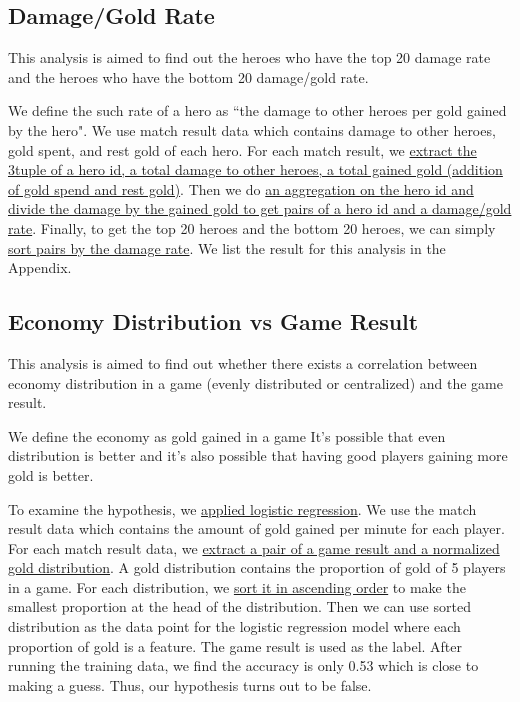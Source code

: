 \documentclass{article}
\begin{document}
\subsection{Damage/Gold Rate}

This analysis is aimed to find out the heroes who have the top 20 damage rate and the heroes who have the bottom 20 damage/gold rate.

We define the such rate of a hero as ``the damage to other heroes per gold gained by the hero". We use match result data which contains damage to other heroes, gold spent, and rest gold of each hero. For each match result, we \href{https://github.com/Vopaaz/big-data-psg-lgd/blob/master/src/main/scala/DamageRate.scala#L39-L41}{extract the 3tuple of a hero id, a total damage to other heroes, a total gained gold (addition of gold spend and rest gold)}. Then we do \href{https://github.com/Vopaaz/big-data-psg-lgd/blob/master/src/main/scala/DamageRate.scala#L42-L44}{an aggregation on the hero id and divide the damage by the gained gold to get pairs of a hero id and a damage/gold rate}. Finally, to get the top 20 heroes and the bottom 20 heroes, we can simply \href{https://github.com/Vopaaz/big-data-psg-lgd/blob/master/src/main/scala/DamageRate.scala#L47-L48}{sort pairs by the damage rate}. We list the result for this analysis in the Appendix.

\subsection{Economy Distribution vs Game Result}

This analysis is aimed to find out whether there exists a correlation between economy distribution in a game (evenly distributed or centralized) and the game result.

We define the economy as gold gained in a game
It's possible that even distribution is better and it's also possible that having good players gaining more gold is better.

To examine the hypothesis, we \href{https://github.com/Vopaaz/big-data-psg-lgd/blob/master/src/main/scala/EcoDistributionTrain.scala#L48-L50}{applied logistic regression}.
We use the match result data which contains the amount of gold gained per minute for each player.
For each match result data, we \href{https://github.com/Vopaaz/big-data-psg-lgd/blob/master/src/main/scala/EcoDistributionTrain.scala#L36-L42}{extract a pair of a game result and a normalized gold distribution}.
A gold distribution contains the proportion of gold of 5 players in a game. For each distribution, we \href{https://github.com/Vopaaz/big-data-psg-lgd/blob/master/src/main/scala/EcoDistributionTrain.scala#L43-L44}{sort it in ascending order} to make the smallest proportion at the head of the distribution.
Then we can use sorted distribution as the data point for the logistic regression model where each proportion of gold is a feature. The game result is used as the label.
After running the training data, we find the accuracy is only 0.53 which is close to making a guess. Thus, our hypothesis turns out to be false.
\end{document}
